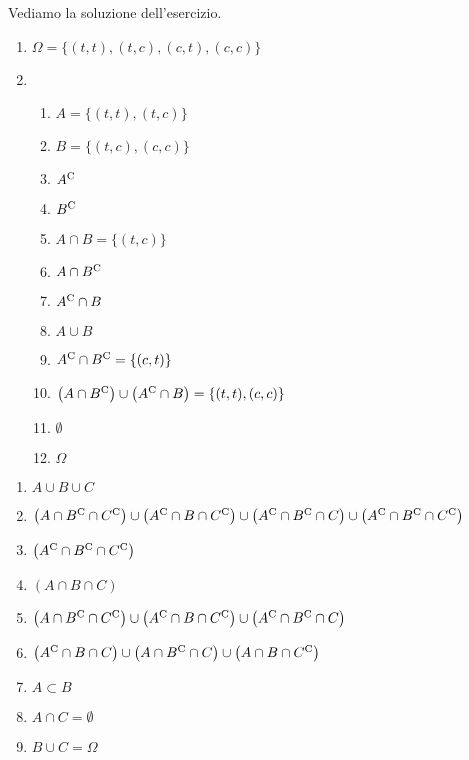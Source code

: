 Vediamo la soluzione dell'esercizio.
\begin{enumerate}
	\item $\Omega =\{( t,t) ,( t,c) ,( c,t) ,( c,c)\}$
	\item
	\begin{enumerate}
		\item $A=\{( t,t) ,( t,c)\}$
		\item $B=\{( t,c) ,( c,c)\}$
		\item $A^{\mathrm{C}}$
		\item $B^{\mathrm{C}}$
		\item $A\cap B=\{( t,c)\}$
		\item $A\cap B^{\mathrm{C}}$
		\item $A^{\mathrm{C}} \cap B$
		\item $A\cup B$
		\item $A^{\mathrm{C}} \cap B^{\mathrm{C}} =\{( c,t)\}$
		\item $\left( A\cap B^{\mathrm{C}}\right) \cup \left( A^{\mathrm{C}} \cap B\right) =\{( t,t) ,( c,c)\}$
		\item $\emptyset $
		\item $\Omega $
	\end{enumerate}
\end{enumerate}

\Soluzione

\begin{enumerate}
	\item $A\cup B\cup C$
	\item $\left( A\cap B^{\mathrm{C}} \cap C^{\mathrm{C}}\right) \cup \left( A^{\mathrm{C}} \cap B\cap C^{\mathrm{C}}\right) \cup \left( A^{\mathrm{C}} \cap B^{\mathrm{C}} \cap C\right) \cup \left( A^{\mathrm{C}} \cap B^{\mathrm{C}} \cap C^{\mathrm{C}}\right)$
	\item $\left( A^{\mathrm{C}} \cap B^{\mathrm{C}} \cap C^{\mathrm{C}}\right)$
	\item $( A\cap B\cap C)$
	\item $\left( A\cap B^{\mathrm{C}} \cap C^{\mathrm{C}}\right) \cup \left( A^{\mathrm{C}} \cap B\cap C^{\mathrm{C}}\right) \cup \left( A^{\mathrm{C}} \cap B^{\mathrm{C}} \cap C\right)$
	\item $\left( A^{\mathrm{C}} \cap B\cap C\right) \cup \left( A\cap B^{\mathrm{C}} \cap C\right) \cup \left( A\cap B\cap C^{\mathrm{C}}\right)$
	\item $A\subset B$
	\item $A\cap C=\emptyset $
	\item $B\cup C=\Omega $
\end{enumerate}

